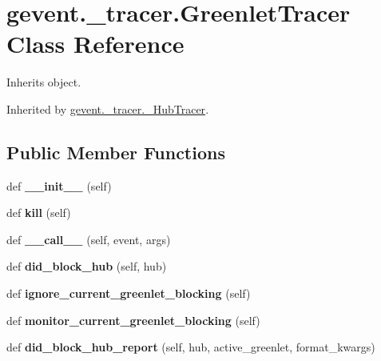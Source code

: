 \hypertarget{classgevent_1_1__tracer_1_1_greenlet_tracer}{}\section{gevent.\+\_\+tracer.\+Greenlet\+Tracer Class Reference}
\label{classgevent_1_1__tracer_1_1_greenlet_tracer}


Inherits object.



Inherited by \hyperlink{classgevent_1_1__tracer_1_1___hub_tracer}{gevent.\+\_\+tracer.\+\_\+\+Hub\+Tracer}.

\subsection*{Public Member Functions}
\begin{DoxyCompactItemize}
\item 
\mbox{\label{classgevent_1_1__tracer_1_1_greenlet_tracer_a434c52a747ef0b14e717dbda474ecdac}} 
def {\bfseries \+\_\+\+\_\+init\+\_\+\+\_\+} (self)
\item 
\mbox{\label{classgevent_1_1__tracer_1_1_greenlet_tracer_a18f2b785dcc3fce76258331879c9b5aa}} 
def {\bfseries kill} (self)
\item 
\mbox{\label{classgevent_1_1__tracer_1_1_greenlet_tracer_a76673bf63ebbb9e8201deb7ce9c076df}} 
def {\bfseries \+\_\+\+\_\+call\+\_\+\+\_\+} (self, event, args)
\item 
\mbox{\label{classgevent_1_1__tracer_1_1_greenlet_tracer_ab1d738de0bccc0f393033923b567f421}} 
def {\bfseries did\+\_\+block\+\_\+hub} (self, hub)
\item 
\mbox{\label{classgevent_1_1__tracer_1_1_greenlet_tracer_a4c0920ab2930b7ca8376de6f70d98cc2}} 
def {\bfseries ignore\+\_\+current\+\_\+greenlet\+\_\+blocking} (self)
\item 
\mbox{\label{classgevent_1_1__tracer_1_1_greenlet_tracer_afc64e6b42993f8ae63c8ac83905dfd8c}} 
def {\bfseries monitor\+\_\+current\+\_\+greenlet\+\_\+blocking} (self)
\item 
\mbox{\label{classgevent_1_1__tracer_1_1_greenlet_tracer_abc59ea75e818ec4a18d5d7f17940da7a}} 
def {\bfseries did\+\_\+block\+\_\+hub\+\_\+report} (self, hub, active\+\_\+greenlet, format\+\_\+kwargs)
\end{DoxyCompactItemize}
